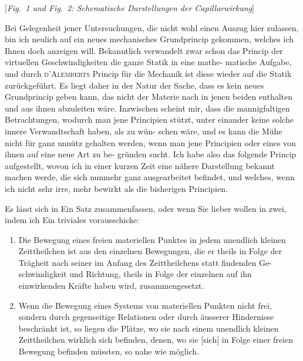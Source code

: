 \documentclass[12pt,a4paper]{article}
\theoremstyle{plain}
\theoremstyle{definition}
\theoremstyle{remark}
\begin{document}
\begin{center}
[\textit{Fig.~1 und Fig.~2: Schematische Darstellungen der Capillarwirkung}]
\end{center}

Bei Gelegenheit jener Untersuchungen, die nicht wohl einen Auszug hier
zulassen, bin ich neulich auf ein neues mechanisches Grundprincip gekommen,
welches ich Ihnen doch anzeigen will. Bekanntlich verwandelt zwar schon
das Princip der virtuellen Geschwindigkeiten die ganze Statik in eine mathe-
matische Aufgabe, und durch \textsc{d'Alemberts} Princip f\"ur die Mechanik ist diese
wieder auf die Statik zur\"uckgef\"uhrt. Es liegt daher in der Natur der Sache,
dass es kein neues Grundprincip geben kann, das nicht der Materie nach in
jenen beiden enthalten und aus ihnen abzuleiten w\"are. Inzwischen scheint
mir, dass die mannigfaltigen Betrachtungen, wodurch man jene Principien
st\"utzt, unter einander keine solche innere Verwandtschaft haben, als zu w\"un-
schen w\"are, und es kann die M\"uhe nicht f\"ur ganz unn\"utz gehalten werden,
wenn man jene Principien oder eines von ihnen auf eine neue Art zu be-
gr\"unden sucht. Ich habe also das folgende Princip aufgestellt, wovon ich
in einer kurzen Zeit eine n\"ahere Darstellung bekannt machen werde, die sich
nunmehr ganz ausgearbeitet befindet, und welches, wenn ich nicht sehr irre,
mehr bewirkt als die bisherigen Principien.

Es l\"asst sich in Ein Satz zusammenfassen, oder wenn Sie lieber wollen in
zwei, indem ich Ein triviales vorausschicke:

\begin{enumerate}[label=\arabic*)]
\item Die Bewegung eines freien materiellen Punktes in jedem unendlich
kleinen Zeittheilchen ist aus den einzelnen Bewegungen, die er theils in Folge
der Tr\"agheit nach seiner im Anfang des Zeittheilchens statt findenden Ge-
schwindigkeit und Richtung, theils in Folge der einzelnen auf ihn einwirkenden
Kr\"afte haben wird, zusammengesetzt.

\item Wenn die Bewegung eines Systems von materiellen Punkten nicht
frei, sondern durch gegenseitige Relationen oder durch \"ausserer Hindernisse
beschr\"ankt ist, so liegen die Pl\"atze, wo sie nach einem unendlich kleinen
Zeittheilchen wirklich sich befinden, denen, wo sie [sich] in Folge einer freien
Bewegung befinden m\"ussten, so nahe wie m\"oglich.
\end{enumerate}
\end{document}
